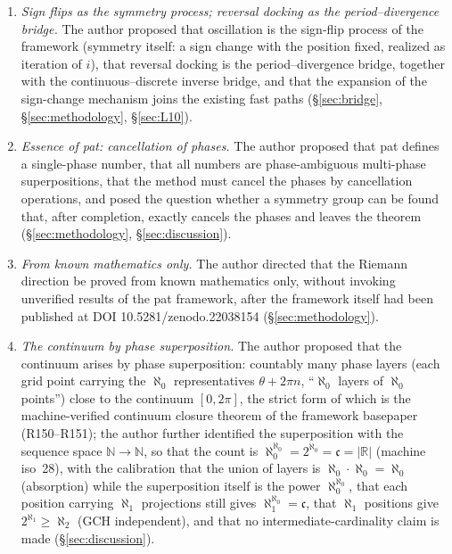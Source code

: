 \documentclass{article}
\begin{document}
\begin{enumerate}
and stable direction), since iterative approximation is itself
finite-reaching-infinite (\S\ref{sec:L11}).
\item \emph{Sign flips as the symmetry process; reversal docking as the
period--divergence bridge.} The author proposed that oscillation is the
sign-flip process of the framework (symmetry itself: a sign change with the
position fixed, realized as iteration of $i$), that reversal docking is the
period--divergence bridge, together with the continuous--discrete inverse
bridge, and that the expansion of the sign-change mechanism joins the
existing fast paths (\S\ref{sec:bridge}, \S\ref{sec:methodology},
\S\ref{sec:L10}).
\item \emph{Essence of pat: cancellation of phases.} The author proposed
that pat defines a single-phase number, that all numbers are
phase-ambiguous multi-phase superpositions, that the method must cancel the
phases by cancellation operations, and posed the question whether a symmetry
group can be found that, after completion, exactly cancels the phases and
leaves the theorem (\S\ref{sec:methodology}, \S\ref{sec:discussion}).
\item \emph{From known mathematics only.} The author directed that the
Riemann direction be proved from known mathematics only, without invoking
unverified results of the pat framework, after the framework itself had
been published at DOI 10.5281/zenodo.22038154 (\S\ref{sec:methodology}).
\item \emph{The continuum by phase superposition.} The author proposed that
the continuum arises by phase superposition: countably many phase layers
(each grid point carrying the $\aleph_0$ representatives $\theta+2\pi n$,
``$\aleph_0$ layers of $\aleph_0$ points'') close to the continuum
$[0,2\pi]$, the strict form of which is the machine-verified continuum
closure theorem of the framework basepaper \cite{patbase} (R150--R151);
the author further identified the superposition with the sequence space
$\mathbb{N}\to\mathbb{N}$, so that the count is
$\aleph_0^{\aleph_0}=2^{\aleph_0}=\mathfrak c=|\mathbb{R}|$ (machine
iso~28), with the calibration that the union of layers is
$\aleph_0\cdot\aleph_0=\aleph_0$ (absorption) while the superposition
itself is the power $\aleph_0^{\aleph_0}$, that each position carrying
$\aleph_1$ projections still gives $\aleph_1^{\aleph_0}=\mathfrak c$,
that $\aleph_1$ positions give $2^{\aleph_1}\ge\aleph_2$ (GCH
independent), and that no intermediate-cardinality claim is made
(\S\ref{sec:discussion}).
\end{enumerate}
\end{document}
